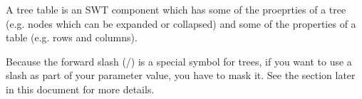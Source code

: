 
A tree table is an SWT component which has some of the proeprties of a tree (e.g. nodes which can be expanded or collapsed) and some of the properties of a table (e.g. rows and columns). 

Because the forward slash (/) is a special symbol for trees, if you want to use a slash as part of your parameter value, you have to mask it. See the section later in this document  for more details. 
